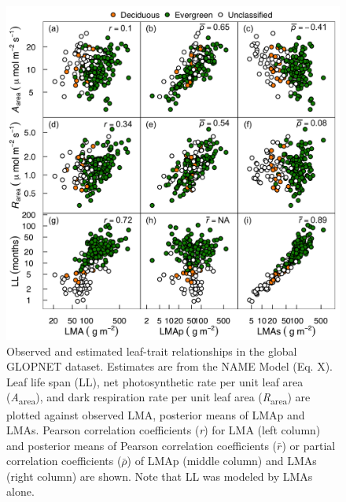 \documentclass[
  12pt,
  a4paper,
,tablecaptionabove
]{scrartcl}
\providecommand{\DIFaddbeginFL}{} %
\providecommand{\DIFaddendFL}{} %
\providecommand{\DIFdelbeginFL}{} %
\providecommand{\DIFdelendFL}{} %
\newcommand{\DIFscaledelfig}{0.5}
\newlength{\DIFdelgraphicswidth} %
\newlength{\DIFdelgraphicsheight} %
\newcommand{\DIFaddincludegraphics}[2][]{{\color{blue}\fbox{\DIFOincludegraphics[#1]{#2}}}} %
\newcommand{\DIFdelincludegraphics}[2][]{%
\sbox{\DIFdelgraphicsbox}{\DIFOincludegraphics[#1]{#2}}%
\settoboxwidth{\DIFdelgraphicswidth}{\DIFdelgraphicsbox} %
\settoboxtotalheight{\DIFdelgraphicsheight}{\DIFdelgraphicsbox} %
\scalebox{\DIFscaledelfig}{%
\parbox[b]{\DIFdelgraphicswidth}{\usebox{\DIFdelgraphicsbox}\\[-\baselineskip] \rule{\DIFdelgraphicswidth}{0em}}\llap{\resizebox{\DIFdelgraphicswidth}{\DIFdelgraphicsheight}{%
\setlength{\unitlength}{\DIFdelgraphicswidth}%
\begin{picture}(1,1)%
\thicklines\linethickness{2pt} %
{\color[rgb]{1,0,0}\put(0,0){\framebox(1,1){}}}%
{\color[rgb]{1,0,0}\put(0,0){\line( 1,1){1}}}%
{\color[rgb]{1,0,0}\put(0,1){\line(1,-1){1}}}%
\end{picture}%
}\hspace*{3pt}}} %
} %
\DeclareRobustCommand{\DIFaddbeginFL}{\DIFOaddbeginFL \let\includegraphics\DIFaddincludegraphics} %
\DeclareRobustCommand{\DIFaddendFL}{\DIFOaddendFL \let\includegraphics\DIFOincludegraphics} %
\DeclareRobustCommand{\DIFdelbeginFL}{\DIFOdelbeginFL \let\includegraphics\DIFdelincludegraphics} %
\DeclareRobustCommand{\DIFdelendFL}{\DIFOaddendFL \let\includegraphics\DIFOincludegraphics} %
\begin{document}
\begin{figure}
\DIFdelbeginFL %
\DIFdelendFL \DIFaddbeginFL \hypertarget{fig:GLplt}{%
\centering
\includegraphics{../figs/GL_scatter.png}
\caption{Observed and estimated leaf-trait relationships in the global GLOPNET dataset.
Estimates are from the NAME Model (Eq. X).
Leaf life span (LL), net photosynthetic rate per unit leaf area (\emph{A}\textsubscript{area}), and dark respiration rate per unit leaf area (\emph{R}\textsubscript{area}) are plotted against observed LMA, posterior means of LMAp and LMAs.
Pearson correlation coefficients (\emph{r}) for LMA (left column) and posterior means of Pearson correlation coefficients (\(\bar{r}\)) or partial correlation coefficients (\(\bar{\rho}\)) of LMAp (middle column) and LMAs (right column) are shown.
Note that LL was modeled by LMAs alone.}\label{fig:GLplt}
}
\DIFaddendFL \end{figure}
\end{document}
